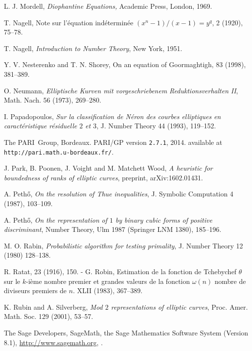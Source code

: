 \begin{thebibliography}{}
L. J. Mordell,
\emph{Diophantine Equations,}
Academic Press, London,
1969.

T. Nagell, 
\newblock Note sur l'\'equation ind\'etermin\'ee $(x^n-1)/(x-1)=y^q$, 
 2 (1920), 75--78.

T. Nagell, 
\emph{Introduction to Number Theory},
New York, 1951.

Y. V. Nesterenko and T. N. Shorey,
\newblock On an equation of Goormaghtigh,
 83 (1998), 381--389.

O. Neumann,
\emph{Elliptische Kurven mit vorgeschriebenem Reduktionsverhalten II},
Math. Nach. 56 (1973), 269--280.

I. Papadopoulos,
\emph{Sur la classification de N\'eron des courbes elliptiques  
en caract\'eristique r\'esiduelle $2$ et $3$}, 
J. Number Theory 44 (1993), 119--152.

The PARI~Group, Bordeaux.
PARI/GP version {\tt 2.7.1}, 2014.
available at {\tt http://pari.math.u-bordeaux.fr/}.

J. Park, B. Poonen, J. Voight and M. Matchett Wood,
\emph{A heuristic for boundedness of ranks of elliptic curves},
preprint, arXiv:1602.01431.

A. Peth\H{o},
\emph{On the resolution of Thue inequalities},
J. Symbolic Computation 4 (1987), 103--109.

A. Peth\H{o},
\emph{On the representation of $1$ by binary cubic forms of positive discriminant},
Number Theory, Ulm 1987 (Springer LNM 1380), 185--196.

M. O. Rabin, 
 \emph{Probabilistic algorithm for testing primality}, J.
Number Theory 12 (1980) 128--138.

R. Ratat,
 23 (1916), 150.
-
G. Robin,
\newblock Estimation de la fonction de Tchebychef $\theta$ sur le $k$-i\`eme nombre premier et grandes valeurs de la fonction $\omega (n)$ nombre de diviseurs premiers de $n$.
 XLII (1983), 367--389.

K. Rubin and A. Silverberg,
\emph{Mod $2$ representations of elliptic curves}, Proc. Amer. Math. Soc. 129 (2001), 53--57.

The Sage Developers,
\newblock SageMath, the Sage Mathematics Software System (Version 8.1),
 \newblock \url{http://www.sagemath.org},
.


\end{thebibliography}
